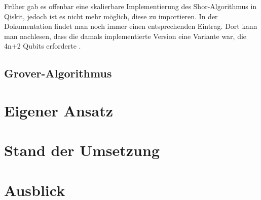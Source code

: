 \documentclass[
	a4paper, %
	10pt, %
	unnumberedsections, %
	twoside, %
]{LTJournalArticle}
\begin{document}
Früher gab es offenbar eine skalierbare Implementierung des Shor-Algorithmus in Qiskit, jedoch ist es nicht mehr möglich, diese zu importieren. In der Dokumentation findet man noch immer einen entsprechenden Eintrag. Dort kann man nachlesen, dass die damals implementierte Version eine Variante war, die 4n+2 Qubits erforderte \autocite{Shor_docu}.



\subsection{Grover-Algorithmus}

\section{Eigener Ansatz}


\section{Stand der Umsetzung}



\section{Ausblick }



\printbibliography %

\end{document}
